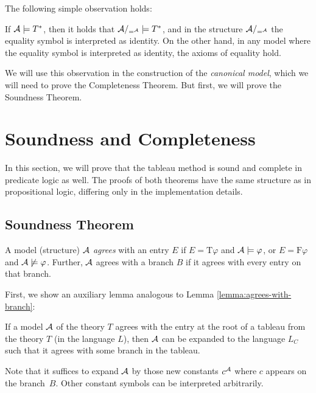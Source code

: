 The following simple observation holds:
\begin{observation}
    If $\mathcal{A}\models T^*$, then it holds that $\mathcal{A}/_{=^{\mathcal{A}}}\models T^*$, and in the structure $\mathcal{A}/_{=^{\mathcal{A}}}$ the equality symbol is interpreted as identity. On the other hand, in any model where the equality symbol is interpreted as identity, the axioms of equality hold.
\end{observation}

We will use this observation in the construction of the \emph{canonical model}, which we will need to prove the Completeness Theorem. But first, we will prove the Soundness Theorem.

\section{Soundness and Completeness}

In this section, we will prove that the tableau method is sound and complete in predicate logic as well. The proofs of both theorems have the same structure as in propositional logic, differing only in the implementation details.

\subsection{Soundness Theorem}

A model (structure) $\mathcal{A}$ \emph{agrees} with an entry $E$ if
$E=\mathrm{T}\varphi$ and $\mathcal{A}\models\varphi$, or $E=\mathrm{F}\varphi$ and $\mathcal{A}\not\models\varphi$. Further, $\mathcal{A}$ agrees with a branch $B$ if it agrees with every entry on that branch.

First, we show an auxiliary lemma analogous to Lemma \ref{lemma:agrees-with-branch}:
\begin{lemma}\label{lemma:agrees-with-branch-predicate}
    If a model $\mathcal{A}$ of the theory $T$ agrees with the entry at the root of a tableau from the theory $T$ (in the language $L$), then $\mathcal{A}$ can be expanded to the language $L_C$ such that it agrees with some branch in the tableau.
\end{lemma}
Note that it suffices to expand $\mathcal{A}$ by those new constants $c^{\mathcal{A}}$ where $c$ appears on the branch~$B$. Other constant symbols can be interpreted arbitrarily.

